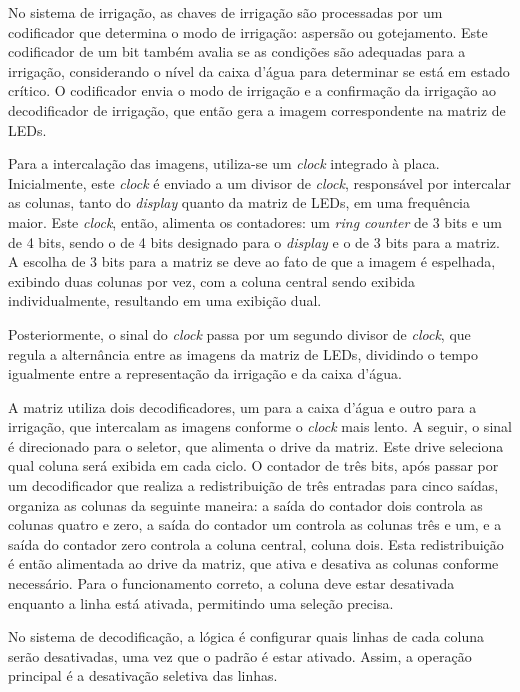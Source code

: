 \documentclass[
	article,			%
	11pt,				%
	oneside,			%
	a4paper,			%
	english,			%
	brazil,				%
	sumario=tradicional
	]{abntex2}
\begin{document}
No sistema de irrigação, as chaves de irrigação são processadas por um codificador que determina o modo de irrigação: aspersão ou gotejamento. Este codificador de um bit também avalia se as condições são adequadas para a irrigação, considerando o nível da caixa d'água para determinar se está em estado crítico. O codificador envia o modo de irrigação e a confirmação da irrigação ao decodificador de irrigação, que então gera a imagem correspondente na matriz de LEDs.

Para a intercalação das imagens, utiliza-se um \textit{clock} integrado à placa. Inicialmente, este \textit{clock} é enviado a um divisor de \textit{clock}, responsável por intercalar as colunas, tanto do \textit{display} quanto da matriz de LEDs, em uma frequência maior. Este \textit{clock}, então, alimenta os contadores: um \textit{ring counter }de 3 bits e um de 4 bits, sendo o de 4 bits designado para o \textit{display} e o de 3 bits para a matriz. A escolha de 3 bits para a matriz se deve ao fato de que a imagem é espelhada, exibindo duas colunas por vez, com a coluna central sendo exibida individualmente, resultando em uma exibição dual.

Posteriormente, o sinal do \textit{clock} passa por um segundo divisor de \textit{clock}, que regula a alternância entre as imagens da matriz de LEDs, dividindo o tempo igualmente entre a representação da irrigação e da caixa d'água. 

A matriz utiliza dois decodificadores, um para a caixa d'água e outro para a irrigação, que intercalam as imagens conforme o \textit{clock} mais lento. A seguir, o sinal é direcionado para o seletor, que alimenta o drive da matriz. Este drive seleciona qual coluna será exibida em cada ciclo. O contador de três bits, após passar por um decodificador que realiza a redistribuição de três entradas para cinco saídas, organiza as colunas da seguinte maneira: a saída do contador dois controla as colunas quatro e zero, a saída do contador um controla as colunas três e um, e a saída do contador zero controla a coluna central, coluna dois. Esta redistribuição é então alimentada ao drive da matriz, que ativa e desativa as colunas conforme necessário. Para o funcionamento correto, a coluna deve estar desativada enquanto a linha está ativada, permitindo uma seleção precisa. 

No sistema de decodificação, a lógica é configurar quais linhas de cada coluna serão desativadas, uma vez que o padrão é estar ativado. Assim, a operação principal é a desativação seletiva das linhas.
\end{document}

